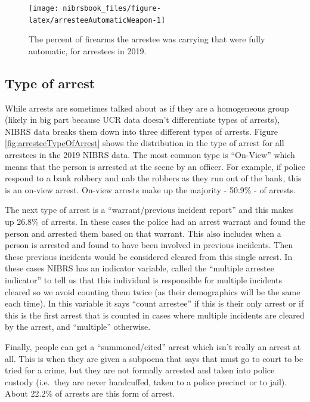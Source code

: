 \documentclass[
  12pt,
  openany]{book}
\begin{document}
\begin{figure}

{\centering \texttt{[image: nibrsbook\_files/figure-latex/arresteeAutomaticWeapon-1]} 

}

\caption{The percent of firearms the arrestee was carrying that were fully automatic, for arrestees in 2019.}\label{fig:arresteeAutomaticWeapon}
\end{figure}

\hypertarget{type-of-arrest}{%
\subsection{Type of arrest}\label{type-of-arrest}}

While arrests are sometimes talked about as if they are a homogeneous group (likely in big part because UCR data doesn't differentiate types of arrests), NIBRS data breaks them down into three different types of arrests. Figure \ref{fig:arresteeTypeOfArrest} shows the distribution in the type of arrest for all arrestees in the 2019 NIBRS data. The most common type is ``On-View'' which means that the person is arrested at the scene by an officer. For example, if police respond to a bank robbery and nab the robbers as they run out of the bank, this is an on-view arrest. On-view arrests make up the majority - 50.9\% - of arrests.

The next type of arrest is a ``warrant/previous incident report'' and this makes up 26.8\% of arrests. In these cases the police had an arrest warrant and found the person and arrested them based on that warrant. This also includes when a person is arrested and found to have been involved in previous incidents. Then these previous incidents would be considered cleared from this single arrest. In these cases NIBRS has an indicator variable, called the ``multiple arrestee indicator'' to tell us that this individual is responsible for multiple incidents cleared so we avoid counting them twice (as their demographics will be the same each time). In this variable it says ``count arrestee'' if this is their only arrest or if this is the first arrest that is counted in cases where multiple incidents are cleared by the arrest, and ``multiple'' otherwise.

Finally, people can get a ``summoned/cited'' arrest which isn't really an arrest at all. This is when they are given a subpoena that says that must go to court to be tried for a crime, but they are not formally arrested and taken into police custody (i.e.~they are never handcuffed, taken to a police precinct or to jail). About 22.2\% of arrests are this form of arrest.
\end{document}
